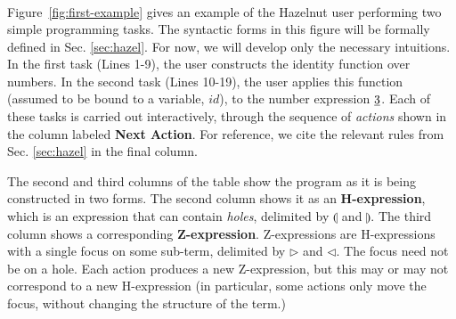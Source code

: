\begin{figure*}[t!]
\[\begin{array}{|c||c|c||l|l|}
\end{array}
\]
\caption{Constructing an identity function in Hazelnut (Lines~1--9), then  applying this function (assumed bound to $id$, not shown) to an argument~(Lines 10--19). The formal syntax and referenced rules in the final column are described in Section \ref{sec:hazel}.}
\label{fig:first-example}
\end{figure*}
%
Figure~\ref{fig:first-example} gives an example of the Hazelnut user
performing two simple programming tasks.
The syntactic forms in this figure will be formally defined in Sec. \ref{sec:hazel}. For now, we will develop only the necessary intuitions. In the first task (Lines 1-9), the user constructs the identity function over numbers. In the second task (Lines 10-19), the user applies this function (assumed to be bound to a variable, $id$), to the number expression $\underline{3}$.
Each of these tasks is carried out interactively, through the sequence of \emph{actions} shown in the  column labeled \textbf{Next Action}. For reference, we cite the relevant rules from Sec. \ref{sec:hazel} in the final column.

The second and third columns of the
table show the program as it is being constructed in two forms. The second column shows it as an \textbf{H-expression}, which is an expression that can contain \emph{holes}, delimited by $\llparenthesis$ and $\rrparenthesis$. The third column shows a corresponding \textbf{Z-expression}. Z-expressions are H-expressions with a single focus on some sub-term, delimited by $\triangleright$ and $\triangleleft$. The focus need not be on a hole.
Each action produces a new Z-expression, but this may or may not correspond to a new H-expression (in particular, some actions only move the focus, without changing the structure of the term.)

